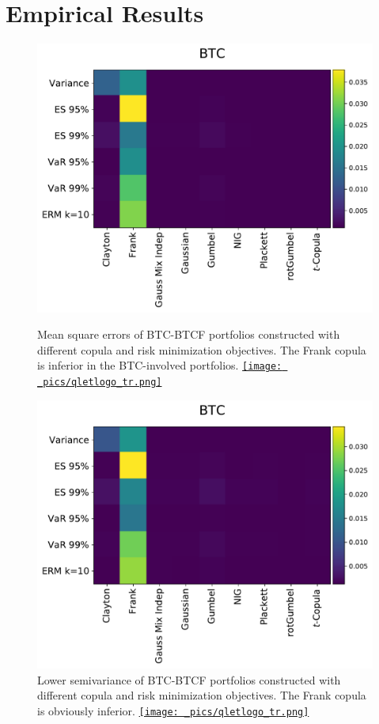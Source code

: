 \section{Empirical Results}\label{sec:results}


\begin{figure}[!th]
\centering
\begin{minipage}[t]{.475\textwidth}
    \centering
    \includegraphics[width=\textwidth]{_pics/MSE_BTC.pdf}
  \caption{Mean square errors of BTC-BTCF portfolios constructed with different copula and risk minimization objectives.
    The Frank copula is inferior in the BTC-involved portfolios.
    \href{http://www.quantlet.com/}{\texttt{[image: \_pics/qletlogo\_tr.png]}} }
\label{fig:MSE_BTC}
\end{minipage}%
\hfill
\begin{minipage}[t]{.475\textwidth}
    \centering
    \includegraphics[width=\textwidth]{_pics/semiLowerVariance_BTC.pdf}
  \caption{Lower semivariance of BTC-BTCF portfolios constructed with different copula and risk minimization objectives.
  The Frank copula is obviously inferior.
  \href{http://www.quantlet.com/}{\texttt{[image: \_pics/qletlogo\_tr.png]}} }
\label{fig:SLV_BTC}
\end{minipage}
\end{figure}
